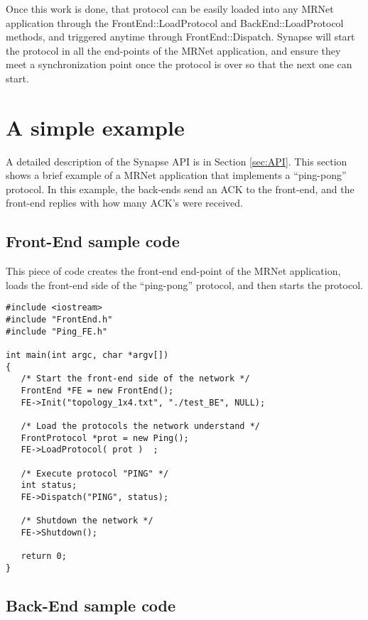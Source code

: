 \documentclass[twoside,a4,english,11pt]{book}
\begin{document}
Once this work is done, that protocol can be easily loaded into any MRNet application through the 
FrontEnd::LoadProtocol and BackEnd::LoadProtocol methods, and triggered anytime through FrontEnd::Dispatch.
Synapse will start the protocol in all the end-points of the MRNet application, and ensure they meet 
a synchronization point once the protocol is over so that the next one can start. 


\chapter{A simple example}
      
A detailed description of the Synapse API is in Section \ref{sec:API}. This section shows a brief example of a 
MRNet application that implements a ``ping-pong'' protocol. In this example, the back-ends send an ACK to the
front-end, and the front-end replies with how many ACK's were received. 

\section{Front-End sample code}

This piece of code creates the front-end end-point of the MRNet application, loads the front-end side of the ``ping-pong''
protocol, and then starts the protocol.


\begin{lstlisting}[frame=single]
#include <iostream>
#include "FrontEnd.h"
#include "Ping_FE.h"

int main(int argc, char *argv[])
{
   /* Start the front-end side of the network */
   FrontEnd *FE = new FrontEnd();
   FE->Init("topology_1x4.txt", "./test_BE", NULL);

   /* Load the protocols the network understand */
   FrontProtocol *prot = new Ping();
   FE->LoadProtocol( prot )  ;

   /* Execute protocol "PING" */
   int status;
   FE->Dispatch("PING", status);

   /* Shutdown the network */
   FE->Shutdown();

   return 0;
}
\end{lstlisting}

\section{Back-End sample code}
\end{document}
